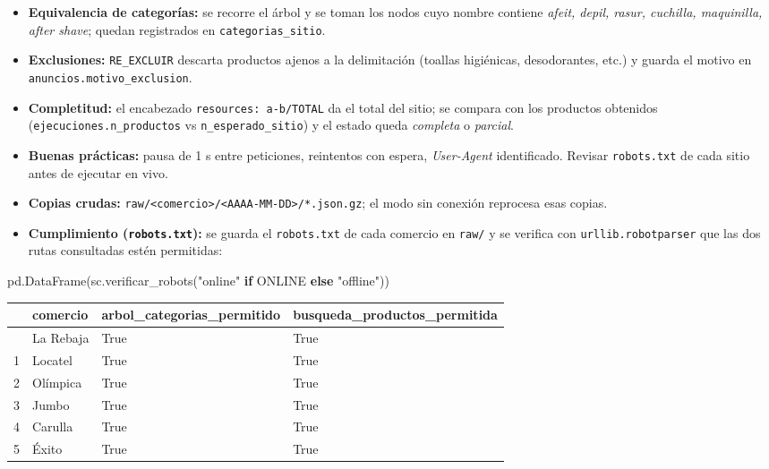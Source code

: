 \documentclass[
  spanish,
  letterpaper,
  DIV=11,
  numbers=noendperiod]{scrartcl}
\newenvironment{Shaded}{\begin{snugshade}}{\end{snugshade}}
\newcommand{\ControlFlowTok}[1]{\textcolor[rgb]{0.00,0.23,0.31}{\textbf{#1}}}
\newcommand{\NormalTok}[1]{\textcolor[rgb]{0.00,0.23,0.31}{#1}}
\newcommand{\StringTok}[1]{\textcolor[rgb]{0.13,0.47,0.30}{#1}}
\newcounter{none} %
\begin{document}
\begin{itemize}
\item
  \textbf{Equivalencia de categorías:} se recorre el árbol y se toman
  los nodos cuyo nombre contiene \emph{afeit, depil, rasur, cuchilla,
  maquinilla, after shave}; quedan registrados en
  \texttt{categorias\_sitio}.
\item
  \textbf{Exclusiones:} \texttt{RE\_EXCLUIR} descarta productos ajenos a
  la delimitación (toallas higiénicas, desodorantes, etc.) y guarda el
  motivo en \texttt{anuncios.motivo\_exclusion}.
\item
  \textbf{Completitud:} el encabezado \texttt{resources:\ a-b/TOTAL} da
  el total del sitio; se compara con los productos obtenidos
  (\texttt{ejecuciones.n\_productos} vs \texttt{n\_esperado\_sitio}) y
  el estado queda \emph{completa} o \emph{parcial}.
\item
  \textbf{Buenas prácticas:} pausa de 1 s entre peticiones, reintentos
  con espera, \emph{User-Agent} identificado. Revisar
  \texttt{robots.txt} de cada sitio antes de ejecutar en vivo.
\item
  \textbf{Copias crudas:}
  \texttt{raw/\textless{}comercio\textgreater{}/\textless{}AAAA-MM-DD\textgreater{}/*.json.gz};
  el modo sin conexión reprocesa esas copias.
\item
  \textbf{Cumplimiento (\texttt{robots.txt}):} se guarda el
  \texttt{robots.txt} de cada comercio en \texttt{raw/} y se verifica
  con \texttt{urllib.robotparser} que las dos rutas consultadas estén
  permitidas:
\end{itemize}

\begin{Shaded}
\begin{Highlighting}[]
\NormalTok{pd.DataFrame(sc.verificar\_robots(}\StringTok{"online"} \ControlFlowTok{if}\NormalTok{ ONLINE }\ControlFlowTok{else} \StringTok{"offline"}\NormalTok{))}
\end{Highlighting}
\end{Shaded}

{\def\LTcaptype{none} %
\begin{longtable}[]{@{}llll@{}}
\toprule\noalign{}
& comercio & arbol\_categorias\_permitido &
busqueda\_productos\_permitida \\
\midrule\noalign{}
\endhead
\bottomrule\noalign{}
\endlastfoot
0 & La Rebaja & True & True \\
1 & Locatel & True & True \\
2 & Olímpica & True & True \\
3 & Jumbo & True & True \\
4 & Carulla & True & True \\
5 & Éxito & True & True \\
\end{longtable}
}
\end{document}
